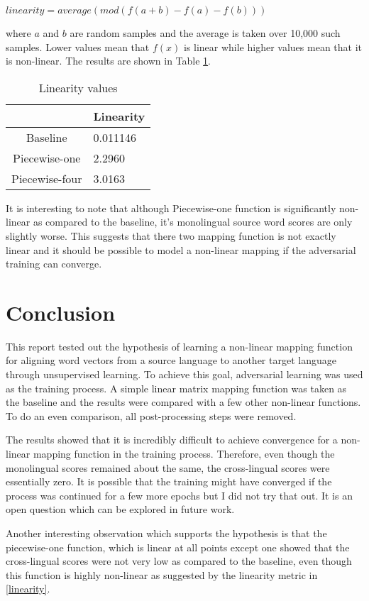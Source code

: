 \documentclass[11pt]{article}
\begin{document}
$linearity = average(mod(f(a + b) - f(a) - f(b)))$

where $a$ and $b$ are random samples and the average is taken over 10,000 such samples. Lower values mean that $f(x)$ is linear while higher values mean that it is non-linear. The results are shown in Table \ref{linearity-table}.

\begin{table}[h]
  \begin{center}
  \begin{tabular}{|c|l|}
  \hline
   & Linearity \\
  \hline
  Baseline & 0.011146 \\
  \hline
  Piecewise-one & 2.2960 \\
  \hline
  Piecewise-four & 3.0163 \\
  \hline
  \end{tabular}
  \end{center}
  \caption{ Linearity values}
  \label{linearity-table}
\end{table}

It is interesting to note that although Piecewise-one function is significantly non-linear as compared to the baseline, it's monolingual source word scores are only slightly worse. This suggests that there two mapping function is not exactly linear and it should be possible to model a non-linear mapping if the adversarial training can converge.

\section{Conclusion}
This report tested out the hypothesis of learning a non-linear mapping function for aligning word vectors from a source language to another target language through unsupervised learning. To achieve this goal, adversarial learning was used as the training process. A simple linear matrix mapping function was taken as the baseline and the results were compared with a few other non-linear functions. To do an even comparison, all post-processing steps were removed.

The results showed that it is incredibly difficult to achieve convergence for a non-linear mapping function in the training process. Therefore, even though the monolingual scores remained about the same, the cross-lingual scores were essentially zero. It is possible that the training might have converged if the process was continued for a few more epochs but I did not try that out. It is an open question which can be explored in future work.

Another interesting observation which supports the hypothesis is that the piecewise-one function, which is linear at all points except one showed that the cross-lingual scores were not very low as compared to the baseline, even though this function is highly non-linear as suggested by the linearity metric in \ref{linearity}.




\end{document}
